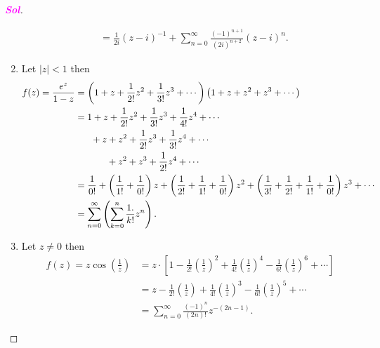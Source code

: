 \documentclass{article}
\theoremstyle{definition}
\newcommand{\of}[1]{\left( #1 \right)}
\newcommand{\abs}[1]{\left\lvert #1 \right\rvert}
\newcommand{\sol}{\textcolor{magenta}{\bf Sol}}
\begin{document}
\begin{proof}[\sol]
\begin{enumerate}[(1)]
\begin{align*}
			&=\frac{1}{2i}(z-i)^{-1}+\sum_{n=0}^\infty\frac{(-1)^{n+1}}{(2i)^{n+2}}(z-i)^n.
		\end{align*}
		\item Let $\abs{z}<1$ then \begin{align*}
			f(z)=\frac{e^z}{1-z}&=\of{1+z+\frac{1}{2!}z^2+\frac{1}{3!}z^3+\cdots}\of{1+z+z^2+z^3+\cdots}\\
			&=1+z+\frac{1}{2!}z^2+\frac{1}{3!}z^3+\frac{1}{4!}z^4+\cdots\\
			&\hspace{6mm}+z+z^2+\frac{1}{2!}z^3+\frac{1}{3!}z^4+\cdots\\
			&\hspace{12mm}+z^2+z^3+\frac{1}{2!}z^4+\cdots\\
			&=\frac{1}{0!}+\of{\frac{1}{1!}+\frac{1}{0!}}z+\of{\frac{1}{2!}+\frac{1}{1!}+\frac{1}{0!}}z^2+\of{\frac{1}{3!}+\frac{1}{2!}+\frac{1}{1!}+\frac{1}{0!}}z^3+\cdots\\
			&=\sum_{n=0}^\infty\of{\sum_{k=0}^n\frac{1.}{k!}z^n}.
		\end{align*}
		\item Let $z\neq 0$ then \begin{align*}
			f(z) = z\cos\of{\frac{1}{z}}&=z\cdot\left[1-\frac{1}{2!}\of{\frac{1}{z}}^2+\frac{1}{4!}\of{\frac{1}{z}}^4-\frac{1}{6!}\of{\frac{1}{z}}^6+\cdots\right]\\
			&=z-\frac{1}{2!}\of{\frac{1}{z}}+\frac{1}{4!}\of{\frac{1}{z}}^3-\frac{1}{6!}\of{\frac{1}{z}}^5+\cdots\\
			&=\sum_{n=0}^\infty\frac{(-1)^n}{(2n)!}z^{-(2n-1)}.
		\end{align*}
	\end{enumerate}
\end{proof}
\vspace{8pt}
\end{document}
